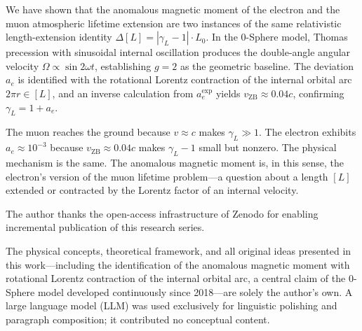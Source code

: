 \documentclass[%
 reprint, amsmath,amssymb, aps, prb, ]{revtex4-2}
\numberwithin{equation}{section}
\newcommand{\vZB}{v_{\text{ZB}}}
\newcommand{\aexp}{a_{e}^{\text{exp}}}
\newcommand{\gammaL}{\gamma_{L}}
\begin{document}
We have shown that the anomalous magnetic moment of the electron and the muon atmospheric lifetime extension are two instances of the same relativistic length-extension identity $\Delta[L] = |\gammaL - 1|\cdot L_0$. In the 0-Sphere model, Thomas precession with sinusoidal internal oscillation produces the double-angle angular velocity $\Omega \propto \sin 2\omega t$, establishing $g = 2$ as the geometric baseline. The deviation $a_e$ is identified with the rotational Lorentz contraction of the internal orbital arc $2\pi r \in [L]$, and an inverse calculation from $\aexp$ yields $\vZB \approx 0.04c$, confirming $\gammaL = 1 + a_e$.

The muon reaches the ground because $v \approx c$ makes $\gammaL \gg 1$. The electron exhibits $a_e \approx 10^{-3}$ because $\vZB \approx 0.04c$ makes $\gammaL - 1$ small but nonzero. The physical mechanism is the same. The anomalous magnetic moment is, in this sense, the electron's version of the muon lifetime problem---a question about a length $[L]$ extended or contracted by the Lorentz factor of an internal velocity.

\begin{acknowledgments}
The author thanks the open-access infrastructure of Zenodo for enabling incremental publication of this research series.

The physical concepts, theoretical framework, and all original ideas presented in this work---including the identification of the anomalous magnetic moment with rotational Lorentz contraction of the internal orbital arc, a central claim of the 0-Sphere model developed continuously since 2018---are solely the author's own. A large language model (LLM) was used exclusively for linguistic polishing and paragraph composition; it contributed no conceptual content.
\end{acknowledgments}
\end{document}
